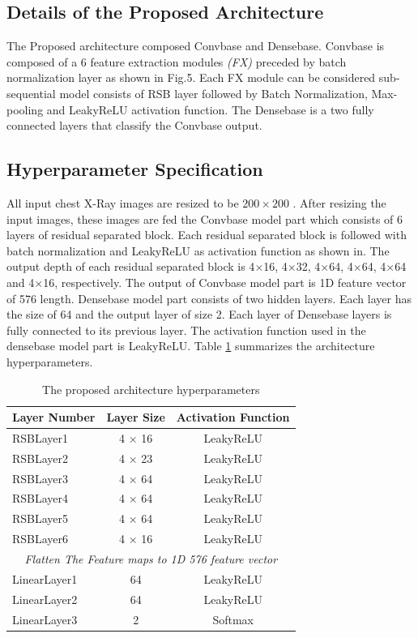 \subsection{Details of the Proposed Architecture}
The Proposed architecture composed Convbase and Densebase. Convbase is composed of a $6$ feature extraction modules \textit{(FX)} preceded by batch normalization layer as shown in Fig.5. Each FX module can be considered sub-sequential model consists of RSB layer followed by Batch Normalization, Max-pooling and LeakyReLU activation function. The Densebase is a two fully connected layers that classify the Convbase output.


\subsection{Hyperparameter Specification}
All input chest X-Ray images are resized to be $200\times 200$ . After resizing the input images, these images are fed the Convbase model part which consists of 6 layers of residual separated block. Each residual separated block is followed with batch normalization and LeakyReLU \cite{he2015delving} as activation function  as shown in. The output depth of each residual separated block is 4$\times$16, 4$\times$32, 4$\times$64, 4$\times$64, 4$\times$64 and 4$\times$16, respectively. The output of Convbase model part is 1D feature vector of 576 length. Densebase model part consists of two hidden layers. Each layer has the  size of 64 and the output layer of size 2. Each layer of Densebase layers is fully connected to its previous layer. The activation function used in the densebase model part is LeakyReLU. Table \ref{lyrSpec} summarizes the architecture hyperparameters.

\begin{table}[htbp]
\caption{The proposed architecture hyperparameters}
\begin{center}

\begin{tabular}{|l|c|c|}
\hline
\textbf{Layer Number} & \textbf{Layer Size} & \textbf{Activation Function} \\
\hline
\hline
RSBLayer1 & 4 $\times$ 16 & LeakyReLU\\
\hline
RSBLayer2 & 4 $\times$ 23 & LeakyReLU\\
\hline
RSBLayer3 & 4 $\times$ 64 & LeakyReLU\\
\hline
RSBLayer4 & 4 $\times$ 64 & LeakyReLU\\
\hline
RSBLayer5 & 4 $\times$ 64 & LeakyReLU\\
\hline
RSBLayer6 & 4 $\times$ 16 & LeakyReLU\\
\hline
\multicolumn{3}{|c|}{\textit{Flatten The Feature maps to 1D 576 feature  vector}}\\
\cline{1-3}
LinearLayer1 & 64 & LeakyReLU\\
\hline
LinearLayer2 & 64 & LeakyReLU\\
\hline
LinearLayer3 & 2 & Softmax\\
\hline
\end{tabular}
\label{lyrSpec}
\end{center}
\end{table}

